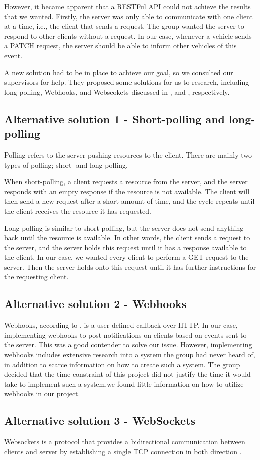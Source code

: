 However, it became apparent that a RESTFul API could not achieve the results that we wanted. Firstly, the server was only able to communicate with one client at a time, i.e., the client that sends a request. The group wanted the server to respond to other clients without a request. In our case, whenever a vehicle sends a PATCH request, the server should be able to inform other vehicles of this event.

A new solution had to be in place to achieve our goal, so we consulted our supervisors for help. They proposed some solutions for us to research, including long-polling, Webhooks, and Webscokets discussed in ,  and , respectively.

\subsection{Alternative solution 1 - Short-polling and long-polling}\label{longpolling}
Polling refers to the server pushing resources to the client. There are mainly two types of polling; short- and long-polling. 

When short-polling, a client requests a resource from the server, and the server responds with an empty response if the resource is not available. The client will then send a new request after a short amount of time, and the cycle repeats until the client receives the resource it has requested.

Long-polling is similar to short-polling, but the server does not send anything back until the resource is available. In other words, the client sends a request to the server, and the server holds this request until it has a response available to the client. In our case, we wanted every client to perform a GET request to the server. Then the server holds onto this request until it has further instructions for the requesting client.

\subsection{Alternative solution 2 - Webhooks}\label{webhooks}
Webhooks, according to \cite{webhooks}, is a user-defined callback over HTTP. In our case, implementing webhooks to post notifications on clients based on events sent to the server. This was a good contender to solve our issue. However, implementing webhooks includes extensive research into a system the group had never heard of, in addition to scarce information on how to create such a system. The group decided that the time constraint of this project did not justify the time it would take to implement such a system.we found little information on how to utilize webhooks in our project.                                                                                                                                                                                                                       

\subsection{Alternative solution 3 - WebSockets}\label{websockets}
Websockets is a protocol that provides a bidirectional communication between clients and server by establishing a single TCP connection in both direction \parencite{rfc_websockets}.  
